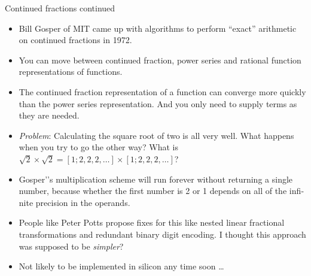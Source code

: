 \documentclass{beamer}
\begin{document}
\begin{frame}{Continued fractions continued}
\small
\begin{itemize}
\item Bill Gosper of MIT came up with algorithms to perform ``exact'' arithmetic on continued fractions in 
			1972.
\item You can move between continued fraction, power series and rational function representations of 
			functions.
\item The continued fraction representation of a function can converge more quickly than the power series 
			representation. And you only need to supply terms as they are needed.
\item \emph{Problem}: Calculating the square root of two is all very well. What happens when you try to go
			the other way? What is $\sqrt{2} \times \sqrt{2} = [1; 2, 2, 2, \ldots] \times [1; 2, 2, 2, \ldots]$?
\item Gosper'’s mul­ti­plica­tion scheme will run for­ever with­out return­ing a sin­gle number, because whether the
			first number is 2 or 1 depends on all of the infi­nite preci­sion in the operands.
\item People like Peter Potts propose fixes for this like nested linear fractional transformations and
			redundant binary digit encoding. I thought this approach was supposed to be \emph{simpler}?
\item Not likely to be implemented in silicon any time soon \ldots
\end{itemize}
\end{frame}
\end{document}
